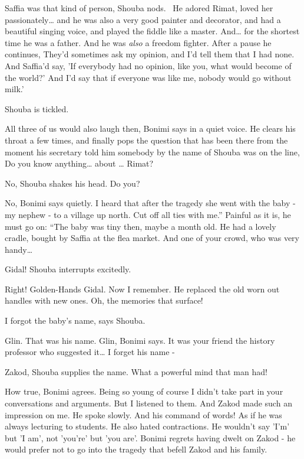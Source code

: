 \documentclass[letterpaper]{article}
\begin{document}
{\textquotedbl}Saffia was that kind of person,{\textquotedbl} Shouba nods. \ {\textquotedbl}He adored Rimat, loved her
passionately{\dots} and he was also a very good painter and decorator, and had a beautiful singing voice, and played
the fiddle like a master. And{\dots} for the shortest time he was a father. And he was \textit{also} a freedom
fighter.{\textquotedbl} After a pause he continues, {\textquotedbl}They'd sometimes ask my opinion, and I'd tell them
that I had none. And Saffia'd say, 'If everybody had no opinion, like you, what would become of the world?' And I'd say
that if everyone was like me, nobody would go without milk.'{\textquotedbl}

Shouba is tickled.

{\textquotedbl}All three of us would also laugh then,{\textquotedbl} Bonimi says in a quiet voice. He clears his throat
a few times, and finally pops the question that has been there from the moment his secretary told him somebody by the
name of Shouba was on the line, {\textquotedbl}Do you know anything{\dots} about {\dots} Rimat?{\textquotedbl} 

{\textquotedbl}No,{\textquotedbl} Shouba shakes his head. {\textquotedbl}Do you?{\textquotedbl} 

{\textquotedbl}No,{\textquotedbl} Bonimi says quietly. {\textquotedbl}I heard that after the tragedy she went with the
baby - my nephew - to a village up north. Cut off all ties with me.'' Painful as it is, he must go on: ``The baby was
tiny then, maybe a month old. He had a lovely cradle, bought by Saffia at the flea market. And one of your crowd, who
was very handy{\dots}{\textquotedbl}

{\textquotedbl}Gidal!{\textquotedbl} Shouba interrupts excitedly.

{\textquotedbl}Right! Golden-Hands Gidal. Now I remember. He replaced the old worn out handles with new ones. Oh, the
memories that surface!{\textquotedbl}

{\textquotedbl}I forgot the baby's name,{\textquotedbl} says Shouba.

{\textquotedbl}Glin. That was his name. Glin,{\textquotedbl} Bonimi says. {\textquotedbl}It was your friend the history
professor who suggested it{\dots} I forget his name -{\textquotedbl}

{\textquotedbl}Zakod,{\textquotedbl} Shouba supplies the name. {\textquotedbl}What a powerful mind that man
had!{\textquotedbl}

{\textquotedbl}How true,{\textquotedbl} Bonimi agrees. {\textquotedbl}Being so young of course I didn't take part in
your conversations and arguments. But I listened to them. And Zakod made such an impression on me. He spoke slowly. And
his command of words! As if he was always lecturing to students. He also hated contractions. He wouldn't say 'I'm' but
'I am', not 'you're' but 'you are'.{\textquotedbl} Bonimi regrets having dwelt on Zakod - he would prefer not to go
into the tragedy that befell Zakod and his family.
\end{document}
